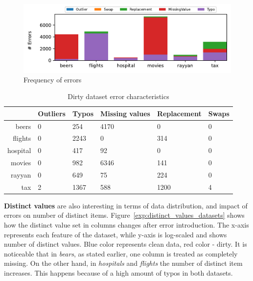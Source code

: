 \begin{figure}[!t]
    \centering
    \includegraphics[width=\textwidth]{figures/plot/error_percent/errors.pdf}
    \caption{Frequency of errors}
    \label{exp:errors_count}
\end{figure}

\begin{table}[!t]
\caption{\label{tab:dirty_num_errors}Dirty dataset error characteristics}
\begin{tabular}{r|l|l|l|l|l}
\toprule
                     & Outliers & Typos & Missing values & Replacement & Swaps \\ \midrule
beers                & 0        & 254   & 4170           & 0                & 0       \\
flights              & 0        & 2243  & 0              & 314              & 0     \\
hospital             & 0        & 417   & 92             & 0                & 0       \\
movies               & 0        & 982   & 6346           & 141              & 0       \\
rayyan               & 0        & 649   & 75             & 224              & 0       \\
tax                  & 2        & 1367  & 588            & 1200             & 4       \\ \bottomrule
\end{tabular}
\end{table}

\textbf{Distinct values} are also interesting in terms of data distribution, and impact of errors on number of distinct items.
Figure~\ref{exp:distinct_values_datasets} shows how the distinct value set in columns changes after error introduction. 
The x-axis represents each feature of the dataset, while y-axis is log-scaled and shows number of distinct values. 
Blue color represents clean data, red color - dirty.
It is noticeable that in \textit{bears}, as stated earlier, one column is treated as completely missing.
On the other hand, in \textit{hospitals} and \textit{flights} the number of distinct item increases.
This happens because of a high amount of typos in both datasets.

